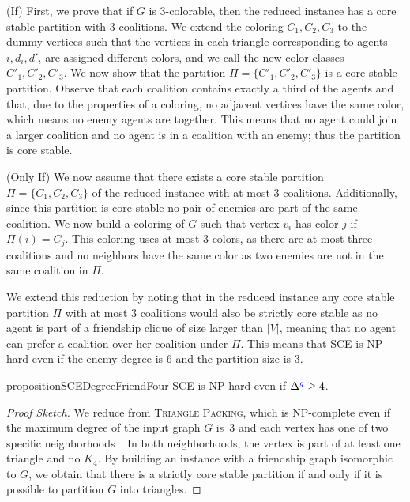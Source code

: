 \documentclass[a4paper,fleqn]{cas-sc}
\newcommand{\friendshipColor}{blue}
\newcommand{\agent}{agent\xspace}
\newcommand{\agents}{agents\xspace}
\newcommand{\partition}{\ensuremath{\Pi}\xspace}
\newcommand{\friendSuperscript}{{\color{\friendshipColor}g}}
\newcommand{\coalitionOfi}[1]{\ensuremath{\partition(#1)}\xspace}
\newcommand{\probname}[1]{\textsc{#1}}
\newcommand{\SCE}{SCE\xspace}
\newcommand{\maxDegree}{\ensuremath{\Delta}}
\newcommand{\maxDegreeFriend}{\ensuremath{\maxDegree^{\friendSuperscript}}\xspace}
\newcommand{\fcliq}{friendship clique\xspace}
\newcommand{\appsymb}{$\star$}
\begin{document}
{    (If) First, we prove that if $G$ is 3-colorable, then the reduced instance has a core stable partition with 3 coalitions.
    We extend the coloring $C_1,C_2,C_3$ to the dummy vertices such that the vertices in each triangle corresponding to \agents $i, d_i, d'_i$ are assigned different colors, and we call the new color classes $C'_1,C'_2,C'_3$. We now show that the partition $\partition = \{C'_1, C'_2, C'_3\}$ is a core stable partition. Observe that each coalition contains exactly a third of the \agents and that, due to the properties of a coloring, no adjacent vertices have the same color, which means no enemy \agents are together. This means that no \agent could join a larger coalition and no \agent is in a coalition with an enemy; thus the partition is core stable.

    (Only If) We now assume that there exists a core stable partition $\partition = \{C_1, C_2, C_3\}$ of the reduced instance with at most 3 coalitions. Additionally, since this partition is core stable no pair of enemies are part of the same coalition. We now build a coloring of $G$ such that vertex $v_i$ has color $j$ if $\coalitionOfi{i}=C_j$. This coloring uses at most 3 colors, as there are at most three coalitions and no neighbors have the same color as two enemies are not in the same coalition in \partition.

    We extend this reduction by noting that in the reduced instance any core stable partition \partition with at most 3 coalitions would also be strictly core stable as no agent is part of a \fcliq of size larger than $|V|$, meaning that no \agent can prefer a coalition over her coalition under \partition. This means that \SCE is NP-hard even if the enemy degree is $6$ and the partition size is $3$.
}



\begin{restatable}[\appsymb]{proposition}{SCEDegreeFriendFour}
    \SCE is NP-hard even if $\maxDegreeFriend \geq 4$.
    \label{prop:SCE_DegreeFriend_4}
\end{restatable}

\begin{proof}[Proof Sketch]
We reduce from \probname{Triangle Packing}, which is NP-complete even if the maximum degree of the input graph $G$ is~3 and each vertex has one of two specific neighborhoods~\cite{Rooij2011PartitionIT}. In both neighborhoods, the vertex is part of at least one triangle and no $K_4$. By building an instance with a friendship graph isomorphic to $G$, we obtain that there is a strictly core stable partition if and only if it is possible to partition $G$ into triangles. 
\end{proof}
\end{document}
